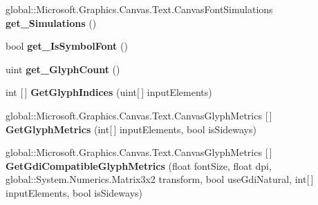 \begin{DoxyCompactItemize}
\item 
\mbox{\label{interface_microsoft_1_1_graphics_1_1_canvas_1_1_text_1_1_i_canvas_font_face_a1781ec281eee2fc4b863e9c8f6a5f7f2}} 
global\+::\+Microsoft.\+Graphics.\+Canvas.\+Text.\+Canvas\+Font\+Simulations {\bfseries get\+\_\+\+Simulations} ()
\item 
\mbox{\label{interface_microsoft_1_1_graphics_1_1_canvas_1_1_text_1_1_i_canvas_font_face_a6416d478c22372ed75f43a3ab1d6d8f9}} 
bool {\bfseries get\+\_\+\+Is\+Symbol\+Font} ()
\item 
\mbox{\label{interface_microsoft_1_1_graphics_1_1_canvas_1_1_text_1_1_i_canvas_font_face_a7c9eb7f5f3fdb03cea2c156067bbe233}} 
uint {\bfseries get\+\_\+\+Glyph\+Count} ()
\item 
\mbox{\label{interface_microsoft_1_1_graphics_1_1_canvas_1_1_text_1_1_i_canvas_font_face_a940c7807b9ae5b022efa2a685392c526}} 
int \mbox{[}$\,$\mbox{]} {\bfseries Get\+Glyph\+Indices} (uint\mbox{[}$\,$\mbox{]} input\+Elements)
\item 
\mbox{\label{interface_microsoft_1_1_graphics_1_1_canvas_1_1_text_1_1_i_canvas_font_face_a287e4336eb4ba744584288150ac1f201}} 
global\+::\+Microsoft.\+Graphics.\+Canvas.\+Text.\+Canvas\+Glyph\+Metrics \mbox{[}$\,$\mbox{]} {\bfseries Get\+Glyph\+Metrics} (int\mbox{[}$\,$\mbox{]} input\+Elements, bool is\+Sideways)
\item 
\mbox{\label{interface_microsoft_1_1_graphics_1_1_canvas_1_1_text_1_1_i_canvas_font_face_a4e5a33ee705a9c9fc505d35ceddca4fc}} 
global\+::\+Microsoft.\+Graphics.\+Canvas.\+Text.\+Canvas\+Glyph\+Metrics \mbox{[}$\,$\mbox{]} {\bfseries Get\+Gdi\+Compatible\+Glyph\+Metrics} (float font\+Size, float dpi, global\+::\+System.\+Numerics.\+Matrix3x2 transform, bool use\+Gdi\+Natural, int\mbox{[}$\,$\mbox{]} input\+Elements, bool is\+Sideways)
\item 

\end{DoxyCompactItemize}
